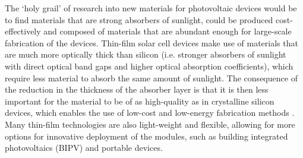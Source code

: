 \documentclass[11pt, twoside]{report}
\begin{document}

The `holy grail' of research into new materials for photovoltaic devices would be to find materials that are strong absorbers of sunlight, could be produced cost-effectively and composed of materials that are abundant enough for large-scale fabrication of the devices. 
Thin-film solar cell devices make use of materials that are much more optically thick than silicon (i.e. stronger absorbers of sunlight with direct optical band gaps and higher optical absorption coefficients), which require less material to absorb the same amount of sunlight. %
The consequence of the reduction in the thickness of the absorber layer is that it is then less important for the material to be of as high-quality as in crystalline silicon devices, which enables the use of low-cost and low-energy fabrication methods \cite{emerging_pv}. Many thin-film technologies are also light-weight and flexible, allowing for more options for innovative deployment of the modules, such as building integrated photovoltaics (BIPV) and portable devices.
\end{document}
